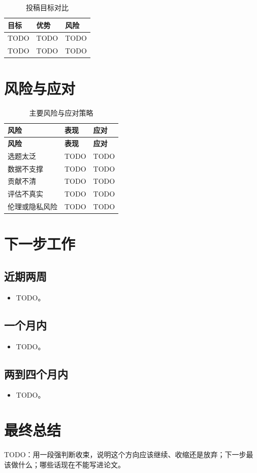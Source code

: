 \documentclass[UTF8,a4paper,11pt]{ctexart}
\begin{document}
\begin{table}[H]
\centering
\caption{投稿目标对比}
\begin{tabularx}{\textwidth}{p{3cm}XX}
\toprule
\textbf{目标} & \textbf{优势} & \textbf{风险} \\
\midrule
TODO & TODO & TODO \\
\midrule
TODO & TODO & TODO \\
\bottomrule
\end{tabularx}
\end{table}

\section{风险与应对}

\begin{longtable}{p{4cm}p{5cm}p{5cm}}
\caption{主要风险与应对策略} \\
\toprule
\textbf{风险} & \textbf{表现} & \textbf{应对} \\
\midrule
\endfirsthead
\toprule
\textbf{风险} & \textbf{表现} & \textbf{应对} \\
\midrule
\endhead
选题太泛 & TODO & TODO \\
\midrule
数据不支撑 & TODO & TODO \\
\midrule
贡献不清 & TODO & TODO \\
\midrule
评估不真实 & TODO & TODO \\
\midrule
伦理或隐私风险 & TODO & TODO \\
\bottomrule
\end{longtable}

\section{下一步工作}

\subsection{近期两周}

\begin{itemize}[leftmargin=2em]
  \item TODO。
\end{itemize}

\subsection{一个月内}

\begin{itemize}[leftmargin=2em]
  \item TODO。
\end{itemize}

\subsection{两到四个月内}

\begin{itemize}[leftmargin=2em]
  \item TODO。
\end{itemize}

\section{最终总结}

\begin{tcolorbox}[keybox,title=最终总结]
TODO：用一段强判断收束，说明这个方向应该继续、收缩还是放弃；下一步最该做什么；哪些话现在不能写进论文。
\end{tcolorbox}
\end{document}
